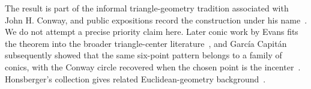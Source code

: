 \documentclass[11pt,a4paper]{article}
\begin{document}
The result is part of the informal triangle-geometry tradition associated
with John H. Conway, and public expositions record the construction under
his name~\cite{mathworldConwayCircle}.  We do not attempt a precise
priority claim here.  Later conic work by Evans fits the theorem into the
broader triangle-center literature~\cite{evans2002conicCenters}, and
Garc{\'i}a Capit{\'a}n subsequently showed that the same six-point pattern
belongs to a family of conics, with the Conway circle recovered when the
chosen point is the
incenter~\cite{garciaCapitan2013generalization}.  Honsberger's collection
gives related Euclidean-geometry background~\cite{honsberger1995episodes}.





\end{document}
